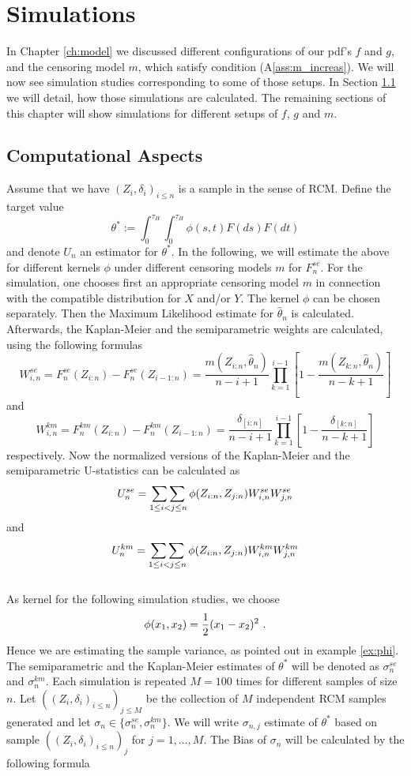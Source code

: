 \chapter{Simulations} \label{ch:simulation}

In Chapter \ref{ch:model} we discussed different configurations of our pdf's $f$ and $g$, and the censoring model $m$, which satisfy condition (A\ref{ass:m_increas}). We will now see simulation studies corresponding to some of those setups. In Section \ref{sec: computational_aspects} we will detail, how those simulations are calculated. The remaining sections of this chapter will show simulations for different setups of $f$, $g$ and $m$.

\section{Computational Aspects}\label{sec: computational_aspects}
Assume that we have $(Z_i, \delta_i)_{i\leq n}$ is a sample in the sense of RCM. Define the target value 
$$\theta^* := \int_{0}^{\tau_H}\int_{0}^{\tau_H} \phi(s,t) F(ds)F(dt)$$
and denote $U_n$ an estimator for $\theta^*$. In the following, we will estimate the above for different kernels $\phi$ under different censoring models $m$ for $F_n^{se}$. For the simulation, one chooses first an appropriate censoring model $m$ in connection with the compatible distribution for $X$ and/or $Y$. The kernel $\phi$ can be chosen separately. Then the Maximum Likelihood estimate for $\hat\theta_n$ is calculated. Afterwards, the Kaplan-Meier and the semiparametric weights are calculated, using the following formulas
$$W_{i,n}^{se} = F_n^{se}(Z_{i:n}) - F_n^{se}(Z_{i-1:n}) = \frac{m(Z_{i:n},\hat\theta_n)}{n-i+1} \prod\limits_{k=1}^{i-1}\left[1-\frac{m(Z_{k:n},\hat\theta_n)}{n-k+1}\right]$$
and 
$$W_{i,n}^{km} = F_n^{km}(Z_{i:n}) - F_n^{km}(Z_{i-1:n}) = \frac{\delta_{[i:n]}}{n-i+1} \prod\limits_{k=1}^{i-1}\left[1-\frac{\delta_{[k:n]}}{n-k+1}\right]$$
respectively. Now the normalized versions of the Kaplan-Meier and the semiparametric U-statistics can be calculated as
$$U_n^{se} = \mathop{\sum\sum}\limits_{1\leq i < j \leq n} \phi(Z_{i:n}, Z_{j:n}) W_{i,n}^{se} W_{j,n}^{se}$$
and 
$$U_n^{km} = \mathop{\sum\sum}\limits_{1\leq i < j \leq n} \phi(Z_{i:n}, Z_{j:n}) W_{i,n}^{km} W_{j,n}^{km}$$
\\
As kernel for the following simulation studies, we choose 
$$\phi(x_1,x_2) = \frac{1}{2} (x_1 - x_2)^2\textrm{ .}$$
Hence we are estimating the sample variance, as pointed out in example \ref{ex:phi}. The semiparametric and the Kaplan-Meier estimates of $\theta^*$ will be denoted as $\sigma_{n}^{se}$ and $\sigma_{n}^{km}$. Each simulation is repeated $M = 100$ times for different samples of size $n$. Let $((Z_i, \delta_i)_{i\leq n})_{j\leq M}$ be the collection of $M$ independent RCM samples generated and let $\sigma_n \in \{\sigma_n^{se}, \sigma_n^{km}\}$. We will write $\sigma_{n,j}$ estimate of $\theta^*$ based on sample $((Z_i, \delta_i)_{i\leq n})_j$ for $j=1,\dots,M$. The Bias of $\sigma_n$ will be calculated by the following formula
